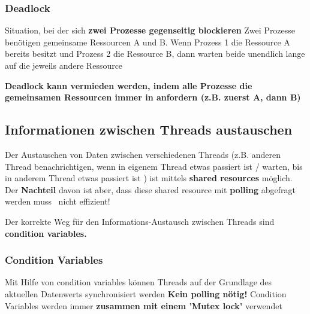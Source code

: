 \subsubsection{Deadlock}

\begin{outline}
    \1 Situation, bei der sich \textbf{zwei Prozesse gegenseitig blockieren}
        \2 Zwei Prozesse benötigen gemeinsame Ressourcen A und B. Wenn Prozess 1 die Ressource A bereits besitzt und Prozess 2 die Ressource B,
            dann warten beide unendlich lange auf die jeweils andere Ressource
\end{outline}

\vspace{0.1cm}

\textbf{Deadlock kann vermieden werden, indem alle Prozesse die gemeinsamen Ressourcen immer in
 anfordern (z.B. zuerst A, dann B)}



\subsection{Informationen zwischen Threads austauschen}

Der Austauschen von Daten zwischen verschiedenen Threads (z.B. anderen Thread benachrichtigen, wenn in eigenem Thread etwas passiert ist / warten,
bis in anderem Thread etwas passiert ist ) ist mittels \textbf{shared resources} möglich. \\
Der \textbf{Nachteil} davon ist aber, dass diese shared resource mit \textbf{polling} abgefragt werden muss \textrightarrow\ nicht effizient!

\vspace{0.1cm}

Der korrekte Weg für den Informations-Austausch zwischen Threads sind \textbf{condition variables.}

\columnbreak


\subsubsection{Condition Variables}

\begin{outline}
    \1 Mit Hilfe von condition variables können Threads auf der Grundlage des aktuellen Datenwerts synchronisiert werden
        \2 \textbf{Kein polling nötig!}
    \1 Condition Variables werden immer \textbf{zusammen mit einem 'Mutex lock'} verwendet
\end{outline}


